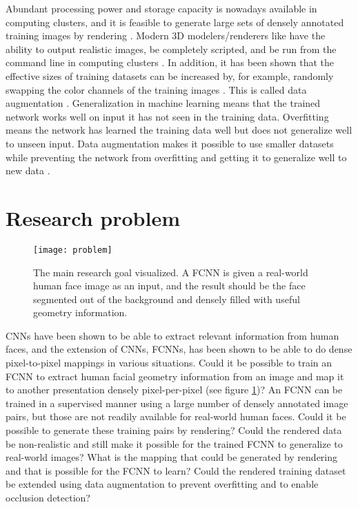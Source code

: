 Abundant processing power and storage capacity is nowadays available in computing clusters, and it is feasible to generate large sets of densely annotated training images by rendering \cite{Movshovitz-Attias2016}. Modern 3D modelers/renderers like \textcite{blender} have the ability to output realistic images, be completely scripted, and be run from the command line in computing clusters \cite{blender}. In addition, it has been shown that the effective sizes of training datasets can be increased by, for example, randomly swapping the color channels of the training images \cite{Wu2015}. This is called data augmentation \cite{Goodfellow2016}. Generalization in machine learning means that the trained network works well on input it has not seen in the training data. Overfitting means the network has learned the training data well but does not generalize well to unseen input. Data augmentation makes it possible to use smaller datasets while preventing the network from overfitting and getting it to generalize well to new data \cite{Goodfellow2016}.

\section{Research problem}

\begin{figure}
    \centering
    \texttt{[image: problem]}
    \caption[Main research goal]{The main research goal visualized. A \acf{FCNN} is given a real-world human face image as an input, and the result should be the face segmented out of the background and densely filled with useful geometry information.}
    \label{fig:research_problem_1}
\end{figure}

\acp{CNN} have been shown to be able to extract relevant information from human faces, and the extension of \acp{CNN}, \acp{FCNN}, has been shown to be able to do dense pixel-to-pixel mappings in various situations. Could it be possible to train an \ac{FCNN} to extract human facial geometry information from an image and map it to another presentation densely pixel-per-pixel (see figure \ref{fig:research_problem_1})? An \ac{FCNN} can be trained in a supervised manner using a large number of densely annotated image pairs, but those are not readily available for real-world human faces. Could it be possible to generate these training pairs by rendering? Could the rendered data be non-realistic and still make it possible for the trained \ac{FCNN} to generalize to real-world images? What is the mapping that could be generated by rendering and that is possible for the \ac{FCNN} to learn? Could the rendered training dataset be extended using data augmentation to prevent overfitting and to enable occlusion detection?

